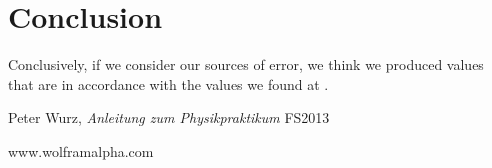 \documentclass{scrreprt}
\begin{document}
\section{Conclusion}
Conclusively, if we consider our sources of error, we think we produced values that are in accordance with the values we found at \cite{wolframalpha}.

\begin{thebibliography}{9}

  Peter Wurz,
  \emph{Anleitung zum Physikpraktikum}
  FS2013

  www.wolframalpha.com

\end{thebibliography}
\end{document}

